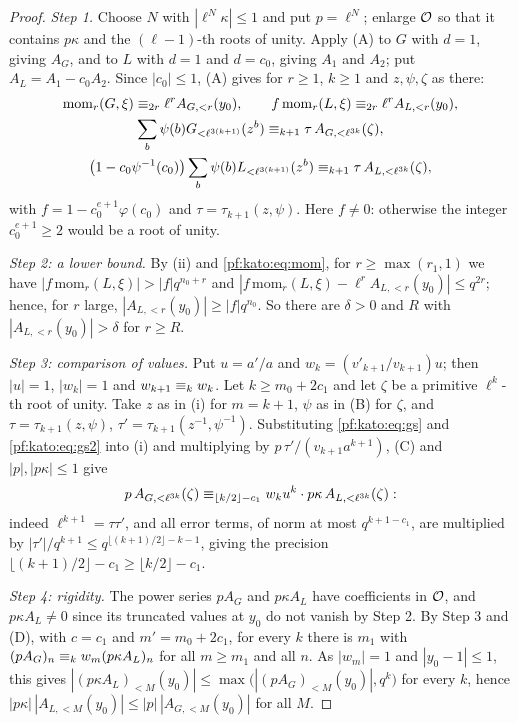 \begin{proof}
\emph{Step 1.} Choose $N$ with $|\ell^N\kappa|\le1$ and put $p=\ell^N$; enlarge $\mathcal{O}$ so that it contains $p\kappa$ and the $(\ell-1)$-th
roots of unity. Apply (A) to $G$ with $d=1$, giving $A_G$, and to $L$ with $d=1$ and $d=c_0$, giving $A_1$ and $A_2$; put
$A_L=A_1-c_0A_2$. Since $|c_0|\le1$, (A) gives for $r\ge1$, $k\ge1$ and $z,\psi,\zeta$ as there:
\begin{gather}
  \mathrm{mom}_r(G,\xi)\equiv_{2r}\ell^rA_{G,<r}(y_0),\qquad f\,\mathrm{mom}_r(L,\xi)\equiv_{2r}\ell^rA_{L,<r}(y_0),\label{pf:kato:eq:mom}\\
  \sum_b\psi(b)G_{<\ell^{3(k+1)}}(z^b)\equiv_{k+1}\tau\,A_{G,<\ell^{3k}}(\zeta),\label{pf:kato:eq:gs}\\
  \bigl(1-c_0\psi^{-1}(c_0)\bigr)\sum_b\psi(b)L_{<\ell^{3(k+1)}}(z^b)\equiv_{k+1}\tau\,A_{L,<\ell^{3k}}(\zeta),\label{pf:kato:eq:gs2}
\end{gather}
with $f=1-c_0^{e+1}\varphi(c_0)$ and $\tau=\tau_{k+1}(z,\psi)$. Here $f\ne0$: otherwise the integer $c_0^{e+1}\ge2$ would be a root of
unity.

\emph{Step 2: a lower bound.} By (ii) and \eqref{pf:kato:eq:mom}, for $r\ge\max(r_1,1)$ we have $|f\,\mathrm{mom}_r(L,\xi)|>|f|q^{n_0+r}$ and
$|f\,\mathrm{mom}_r(L,\xi)-\ell^rA_{L,<r}(y_0)|\le q^{2r}$; hence, for $r$ large, $|A_{L,<r}(y_0)|\ge|f|q^{n_0}$. So there are $\delta>0$ and $R$
with $|A_{L,<r}(y_0)|>\delta$ for $r\ge R$.

\emph{Step 3: comparison of values.} Put $u=a'/a$ and $w_k=(v'_{k+1}/v_{k+1})u$; then $|u|=1$, $|w_k|=1$ and $w_{k+1}\equiv_{k}w_k$. Let
$k\ge m_0+2c_1$ and let $\zeta$ be a primitive $\ell^k$-th root of unity. Take $z$ as in (i) for $m=k+1$, $\psi$ as in (B) for $\zeta$, and
$\tau=\tau_{k+1}(z,\psi)$, $\tau'=\tau_{k+1}(z^{-1},\psi^{-1})$. Substituting \eqref{pf:kato:eq:gs} and \eqref{pf:kato:eq:gs2} into (i) and multiplying by
$p\,\tau'/(v_{k+1}a^{k+1})$, (C) and $|p|,|p\kappa|\le1$ give
\[
  p\,A_{G,<\ell^{3k}}(\zeta)\equiv_{\lfloor k/2\rfloor-c_1}w_ku^k\cdot p\kappa\,A_{L,<\ell^{3k}}(\zeta):
\]
indeed $\ell^{k+1}=\tau\tau'$, and all error terms, of norm at most $q^{k+1-c_1}$, are multiplied by $|\tau'|/q^{k+1}\le q^{\lfloor(k+1)/2\rfloor-k-1}$, giving the precision $\lfloor(k+1)/2\rfloor-c_1\ge\lfloor k/2\rfloor-c_1$.

\emph{Step 4: rigidity.} The power series $pA_G$ and $p\kappa A_L$ have coefficients in $\mathcal{O}$, and $p\kappa A_L\ne0$ since its truncated
values at $y_0$ do not vanish by Step 2. By Step 3 and (D), with $c=c_1$ and $m'=m_0+2c_1$, for every $k$ there is $m_1$ with
$(pA_G)_n\equiv_{k}w_m(p\kappa A_L)_n$ for all $m\ge m_1$ and all $n$. As $|w_m|=1$ and $|y_0-1|\le1$, this gives
$|(p\kappa A_L)_{<M}(y_0)|\le\max\bigl(|(pA_G)_{<M}(y_0)|,q^k\bigr)$ for every $k$, hence $|p\kappa|\,|A_{L,<M}(y_0)|\le|p|\,|A_{G,<M}(y_0)|$ for
all $M$.


\end{proof}
